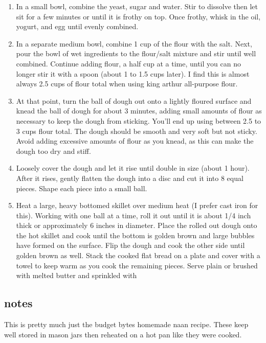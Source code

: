 \documentclass[]{book}
\providecommand{\tightlist}{%
  \setlength{\itemsep}{0pt}\setlength{\parskip}{0pt}}
\begin{document}
\begin{enumerate}
\def\labelenumi{\arabic{enumi}.}
\tightlist
\item
  In a small bowl, combine the yeast, sugar and water. Stir to dissolve then let sit for a few minutes or until it is
  frothy on top. Once frothy, whisk in the oil, yogurt, and egg until evenly combined.
\item
  In a separate medium bowl, combine 1 cup of the flour with the salt. Next, pour the bowl of wet ingredients
  to the flour/salt mixture and stir until well combined. Continue adding flour, a half cup at a time, until you can
  no longer stir it with a spoon (about 1 to 1.5 cups later). I find this is almost always 2.5 cups of flour total
  when using king arthur all-purpose flour.
\item
  At that point, turn the ball of dough out onto a lightly floured surface and knead the ball of dough for about
  3 minutes, adding small amounts of flour as necessary to keep the dough from sticking. You'll end up using between
  2.5 to 3 cups flour total. The dough should be smooth and very soft but not sticky. Avoid adding excessive amounts
  of flour as you knead, as this can make the dough too dry and stiff.
\item
  Loosely cover the dough and let it rise until double in size (about 1 hour). After it rises, gently flatten the
  dough into a disc and cut it into 8 equal pieces. Shape each piece into a small ball.
\item
  Heat a large, heavy bottomed skillet over medium heat (I prefer cast iron for this). Working with one ball at a time,
  roll it out until it is about 1/4 inch thick or approximately 6 inches in diameter. Place the rolled out dough onto
  the hot skillet and cook until the bottom is golden brown and large bubbles have formed on the surface. Flip the dough
  and cook the other side until golden brown as well. Stack the cooked flat bread on a plate and cover with a towel to
  keep warm as you cook the remaining pieces. Serve plain or brushed with melted butter and sprinkled with
\end{enumerate}

\hypertarget{notes-27}{%
\subsection{notes}\label{notes-27}}

This is pretty much just the budget bytes homemade naan recipe. These keep well stored in mason jars then reheated on
a hot pan like they were cooked.
\end{document}
